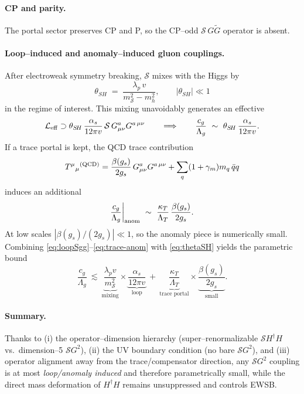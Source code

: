 \documentclass[10pt]{article}
\theoremstyle{definition}
\theoremstyle{plain}
\begin{document}
\paragraph{CP and parity.}\label{par:uom-main-133}
The portal sector preserves CP and P, so the CP–odd $\mathcal S\, G\tilde G$ operator is absent.

\paragraph{Loop–induced and anomaly–induced gluon couplings.}\label{par:uom-main-134}
After electroweak symmetry breaking, $\mathcal S$ mixes with the Higgs by
\begin{equation}
\theta_{S\!H}\;=\;\frac{\lambda_p\,v}{m_{\mathcal S}^2 - m_h^2},\qquad |\theta_{S\!H}|\ll 1
\label{eq:thetaSH}
\end{equation}
in the regime of interest. This mixing unavoidably generates an effective
\begin{equation}
\mathcal L_{\rm eff}\supset
\theta_{S\!H}\,\frac{\alpha_s}{12\pi v}\,\mathcal S\,G_{\mu\nu}^a G^{a\,\mu\nu}
\qquad\Longrightarrow\qquad
\frac{c_g}{\Lambda_g}\ \sim\ \theta_{S\!H}\,\frac{\alpha_s}{12\pi v}.
\label{eq:loopSgg}
\end{equation}
If a trace portal is kept, the QCD trace contribution
\begin{equation}
T^\mu{}_\mu{}^{\rm (QCD)}
=\frac{\beta(g_s)}{2g_s}\,G_{\mu\nu}^a G^{a\,\mu\nu}
+\sum_q (1+\gamma_m)m_q\,\bar q q
\label{eq:traceQCD}
\end{equation}
induces an additional
\begin{equation}
\frac{c_g}{\Lambda_g}\bigg|_{\rm anom}\ \sim\ \frac{\kappa_T}{\Lambda_T}\,\frac{\beta(g_s)}{2g_s}.
\label{eq:trace-anom}
\end{equation}
At low scales $|\beta(g_s)/(2g_s)|\ll 1$, so the anomaly piece is numerically small. Combining \eqref{eq:loopSgg}–\eqref{eq:trace-anom} with \eqref{eq:thetaSH} yields the parametric bound
\[
\frac{c_g}{\Lambda_g}\ \lesssim\ \underbrace{\frac{\lambda_p v}{m_{\mathcal S}^2}}_{\text{mixing}}\times\underbrace{\frac{\alpha_s}{12\pi v}}_{\text{loop}}\ +\ \underbrace{\frac{\kappa_T}{\Lambda_T}}_{\text{trace portal}}\times\underbrace{\frac{\beta(g_s)}{2g_s}}_{\text{small}}.
\]

\paragraph{Summary.}\label{par:uom-main-135}
Thanks to (i) the operator–dimension hierarchy (super–renormalizable $\mathcal S H^\dagger H$ vs.\ dimension–5 $\mathcal S G^2$), (ii) the UV boundary condition (no bare $\mathcal S G^2$), and (iii) operator alignment away from the trace/compensator direction, any $\mathcal S G^2$ coupling is at most \emph{loop/anomaly induced} and therefore parametrically small, while the direct mass deformation of $H^\dagger H$ remains unsuppressed and controls EWSB. 
\end{document}
